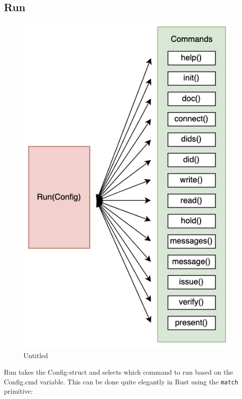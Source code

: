 \hypertarget{run}{%
\subsection{Run}\label{run}}

\begin{figure}
\centering
\includegraphics{Architecture 1442df162dbe45f4a423ba37d3e12363/Untitled 3.png}
\caption{Untitled}
\end{figure}

Run takes the Config-struct and selects which command to run based on
the Config.cmd variable. This can be done quite elegantly in Rust using
the \lstinline!match! primitive:

